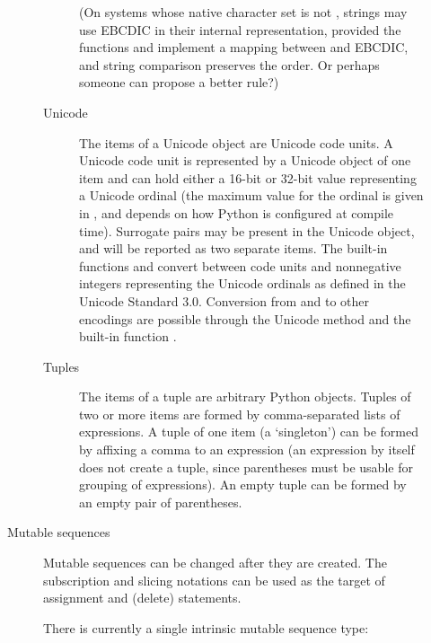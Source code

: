 \begin{description}
\begin{description}
\begin{description}
(On systems whose native character set is not \ASCII, strings may use
EBCDIC in their internal representation, provided the functions
 and  implement a mapping between \ASCII{} and
EBCDIC, and string comparison preserves the \ASCII{} order.
Or perhaps someone can propose a better rule?)

\item[Unicode]
The items of a Unicode object are Unicode code units.  A Unicode code
unit is represented by a Unicode object of one item and can hold
either a 16-bit or 32-bit value representing a Unicode ordinal (the
maximum value for the ordinal is given in , and
depends on how Python is configured at compile time).  Surrogate pairs
may be present in the Unicode object, and will be reported as two
separate items.  The built-in functions
 and
 convert between code units and
nonnegative integers representing the Unicode ordinals as defined in
the Unicode Standard 3.0. Conversion from and to other encodings are
possible through the Unicode method  and the built-in
function .

\item[Tuples]
The items of a tuple are arbitrary Python objects.
Tuples of two or more items are formed by comma-separated lists
of expressions.  A tuple of one item (a `singleton') can be formed
by affixing a comma to an expression (an expression by itself does
not create a tuple, since parentheses must be usable for grouping of
expressions).  An empty tuple can be formed by an empty pair of
parentheses.

\end{description} %

\item[Mutable sequences]
Mutable sequences can be changed after they are created.  The
subscription and slicing notations can be used as the target of
assignment and  (delete) statements.

There is currently a single intrinsic mutable sequence type:


\end{description}
\end{description}
